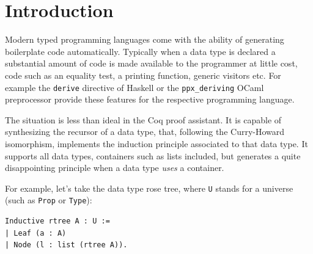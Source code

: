 \documentclass[sigplan,10pt,review]{acmart}\settopmatter{printfolios=true,printccs=false,printacmref=false}
\begin{document}


\maketitle

\section{Introduction}

Modern typed programming languages come with the ability of generating
boilerplate code automatically. Typically when a data type is declared
a substantial amount of code is made available to the programmer at
little cost, code such as an equality test, a printing function,
generic visitors etc.  For example the \lstinline+derive+ directive of
Haskell or the
\lstinline+ppx_deriving+ OCaml preprocessor
provide these features for the respective programming language.

The situation is less than ideal in the Coq proof assistant.  It is
capable of synthesizing the recursor of a data type, that,
following the Curry-Howard isomorphism, implements the induction
principle associated to that data type. It supports all data types,
containers such as lists included, but generates a quite disappointing
principle when a data type \emph{uses} a container.

For example, let's take the data type rose tree, where \lstinline+U+
stands for a universe (such as \lstinline+Prop+ or \lstinline+Type+):

\begin{minipage}{\textwidth}\begin{lstlisting}
Inductive rtree A : U :=
| Leaf (a : A)
| Node (l : list (rtree A)).
\end{lstlisting}\end{minipage}
\end{document}
